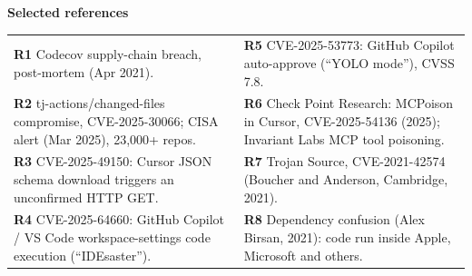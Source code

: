 \documentclass[11pt]{article}
\begin{document}
\vspace{6pt}
\noindent\textbf{Selected references}\\[2pt]
\begin{tabular}{@{}L{12.2cm} L{12.2cm}@{}}
\textbf{R1} Codecov supply-chain breach, post-mortem (Apr 2021). &
\textbf{R5} CVE-2025-53773: GitHub Copilot auto-approve (``YOLO mode''), CVSS 7.8. \\
\textbf{R2} tj-actions/changed-files compromise, CVE-2025-30066; CISA alert (Mar 2025), 23{,}000+ repos. &
\textbf{R6} Check Point Research: MCPoison in Cursor, CVE-2025-54136 (2025); Invariant Labs MCP tool poisoning. \\
\textbf{R3} CVE-2025-49150: Cursor JSON schema download triggers an unconfirmed HTTP GET. &
\textbf{R7} Trojan Source, CVE-2021-42574 (Boucher and Anderson, Cambridge, 2021). \\
\textbf{R4} CVE-2025-64660: GitHub Copilot / VS Code workspace-settings code execution (``IDEsaster''). &
\textbf{R8} Dependency confusion (Alex Birsan, 2021): code run inside Apple, Microsoft and others. \\
\end{tabular}
\end{document}
